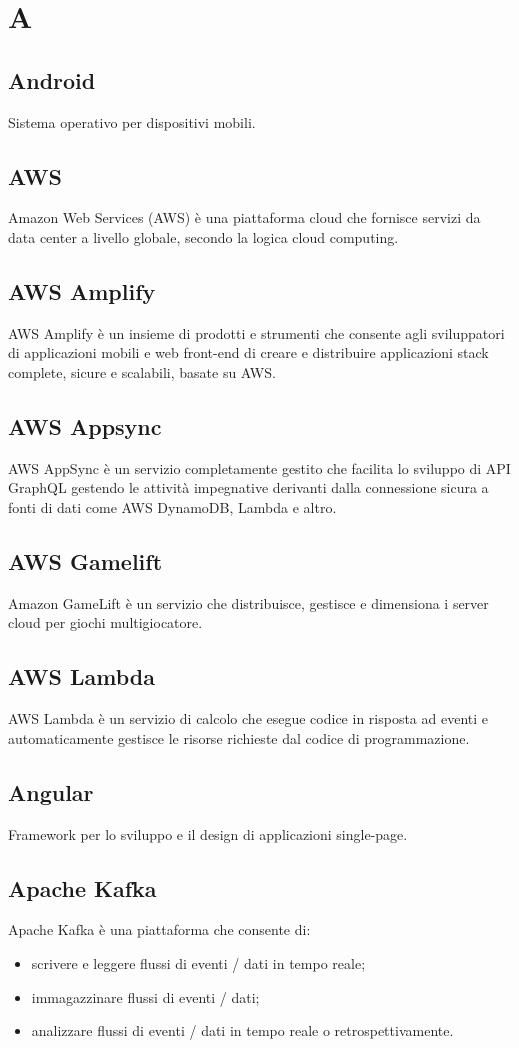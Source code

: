 \newpage \section{A}
\subsection{Android} Sistema operativo per dispositivi mobili.
\subsection{AWS} Amazon Web Services (AWS) è una piattaforma cloud che fornisce servizi da data center a livello globale, secondo la logica cloud computing.
\subsection{AWS Amplify} AWS Amplify è un insieme di prodotti e strumenti che consente agli sviluppatori di applicazioni mobili e web front-end di creare e distribuire applicazioni stack complete, sicure e scalabili, basate su AWS.
\subsection{AWS Appsync} AWS AppSync è un servizio completamente gestito che facilita lo sviluppo di API GraphQL gestendo le attività impegnative derivanti dalla connessione sicura a fonti di dati come AWS DynamoDB, Lambda e altro.
\subsection{AWS Gamelift} Amazon GameLift è un servizio che distribuisce, gestisce e dimensiona i server cloud per giochi multigiocatore.
\subsection{AWS Lambda} AWS Lambda è un servizio di calcolo che esegue codice in risposta ad eventi e automaticamente gestisce le risorse richieste dal codice di programmazione.
\subsection{Angular} Framework per lo sviluppo e il design di applicazioni single-page.
\subsection{Apache Kafka} Apache Kafka è una piattaforma che consente di:
\begin{itemize}
	\item scrivere e leggere flussi di eventi / dati in tempo reale;
	\item immagazzinare flussi di eventi / dati;
	\item analizzare flussi di eventi / dati in tempo reale o retrospettivamente.
\end{itemize}
